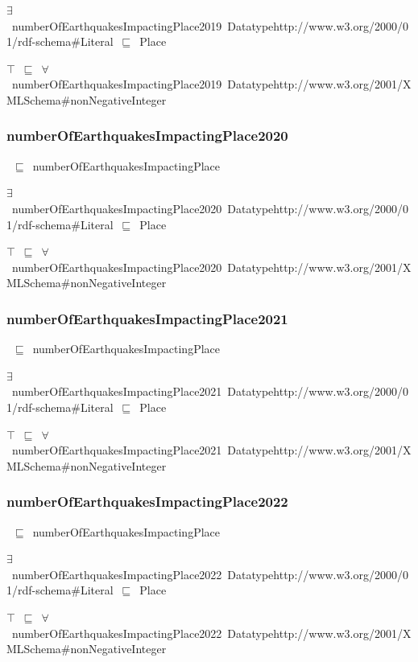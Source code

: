 \documentclass{article}
\begin{document}
\ensuremath{\exists}~numberOfEarthquakesImpactingPlace2019~Datatypehttp://www.w3.org/2000/01/rdf-schema#Literal~\ensuremath{\sqsubseteq}~Place

\ensuremath{\top}~\ensuremath{\sqsubseteq}~\ensuremath{\forall}~numberOfEarthquakesImpactingPlace2019~Datatypehttp://www.w3.org/2001/XMLSchema#nonNegativeInteger

\subsubsection*{numberOfEarthquakesImpactingPlace2020}

~\ensuremath{\sqsubseteq}~numberOfEarthquakesImpactingPlace

\ensuremath{\exists}~numberOfEarthquakesImpactingPlace2020~Datatypehttp://www.w3.org/2000/01/rdf-schema#Literal~\ensuremath{\sqsubseteq}~Place

\ensuremath{\top}~\ensuremath{\sqsubseteq}~\ensuremath{\forall}~numberOfEarthquakesImpactingPlace2020~Datatypehttp://www.w3.org/2001/XMLSchema#nonNegativeInteger

\subsubsection*{numberOfEarthquakesImpactingPlace2021}

~\ensuremath{\sqsubseteq}~numberOfEarthquakesImpactingPlace

\ensuremath{\exists}~numberOfEarthquakesImpactingPlace2021~Datatypehttp://www.w3.org/2000/01/rdf-schema#Literal~\ensuremath{\sqsubseteq}~Place

\ensuremath{\top}~\ensuremath{\sqsubseteq}~\ensuremath{\forall}~numberOfEarthquakesImpactingPlace2021~Datatypehttp://www.w3.org/2001/XMLSchema#nonNegativeInteger

\subsubsection*{numberOfEarthquakesImpactingPlace2022}

~\ensuremath{\sqsubseteq}~numberOfEarthquakesImpactingPlace

\ensuremath{\exists}~numberOfEarthquakesImpactingPlace2022~Datatypehttp://www.w3.org/2000/01/rdf-schema#Literal~\ensuremath{\sqsubseteq}~Place

\ensuremath{\top}~\ensuremath{\sqsubseteq}~\ensuremath{\forall}~numberOfEarthquakesImpactingPlace2022~Datatypehttp://www.w3.org/2001/XMLSchema#nonNegativeInteger
\end{document}
